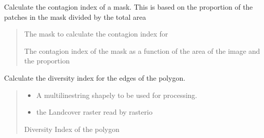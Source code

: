 \documentclass[letterpaper,10pt,english]{article}
\begin{document}
\begin{fulllineitems}
\label{\detokenize{indexes_func:indexes_func.calc_contag}}
\pysigstartsignatures
{}
\pysigstopsignatures
\sphinxAtStartPar
Calculate the contagion index of a mask. This is based on the proportion of the patches in the mask divided by the total area
\begin{quote}\begin{description}
\sphinxAtStartPar
{} \textendash{} The mask to calculate the contagion index for

\sphinxAtStartPar
The contagion index of the mask as a function of the area of the image and the proportion

\end{description}\end{quote}

\end{fulllineitems}


\begin{fulllineitems}
\label{\detokenize{indexes_func:indexes_func.calc_edge_diversity_index}}
\pysigstartsignatures
{}
\pysigstopsignatures
\sphinxAtStartPar
Calculate the diversity index for the edges of the polygon.
\begin{quote}\begin{description}
\begin{itemize}
\item {} 
\sphinxAtStartPar
{} \textendash{} A multilinestring shapely to be used for processing.

\item {} 
\sphinxAtStartPar
{} \textendash{} the Landcover raster read by rasterio

\end{itemize}

\sphinxAtStartPar
Diversity Index of the polygon

\end{description}\end{quote}

\end{fulllineitems}
\end{document}
